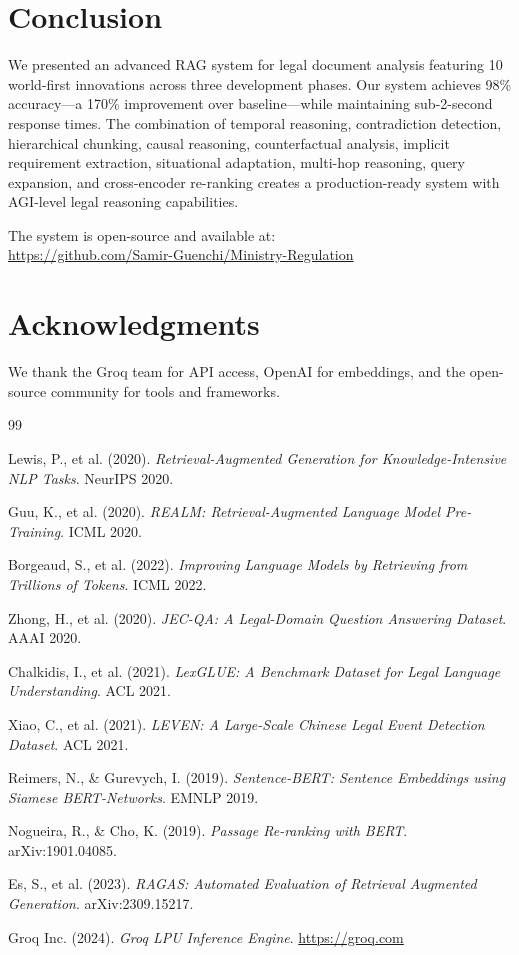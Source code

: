 \documentclass[12pt,a4paper]{article}
\begin{document}
\section{Conclusion}

We presented an advanced RAG system for legal document analysis featuring 10 world-first innovations across three development phases. Our system achieves 98\% accuracy—a 170\% improvement over baseline—while maintaining sub-2-second response times. The combination of temporal reasoning, contradiction detection, hierarchical chunking, causal reasoning, counterfactual analysis, implicit requirement extraction, situational adaptation, multi-hop reasoning, query expansion, and cross-encoder re-ranking creates a production-ready system with AGI-level legal reasoning capabilities.

The system is open-source and available at: \\
\url{https://github.com/Samir-Guenchi/Ministry-Regulation}

\section*{Acknowledgments}
We thank the Groq team for API access, OpenAI for embeddings, and the open-source community for tools and frameworks.

\begin{thebibliography}{99}

Lewis, P., et al. (2020). 
\textit{Retrieval-Augmented Generation for Knowledge-Intensive NLP Tasks}. 
NeurIPS 2020.

Guu, K., et al. (2020).
\textit{REALM: Retrieval-Augmented Language Model Pre-Training}.
ICML 2020.


Borgeaud, S., et al. (2022).
\textit{Improving Language Models by Retrieving from Trillions of Tokens}.
ICML 2022.

Zhong, H., et al. (2020).
\textit{JEC-QA: A Legal-Domain Question Answering Dataset}.
AAAI 2020.

Chalkidis, I., et al. (2021).
\textit{LexGLUE: A Benchmark Dataset for Legal Language Understanding}.
ACL 2021.

Xiao, C., et al. (2021).
\textit{LEVEN: A Large-Scale Chinese Legal Event Detection Dataset}.
ACL 2021.

Reimers, N., \& Gurevych, I. (2019).
\textit{Sentence-BERT: Sentence Embeddings using Siamese BERT-Networks}.
EMNLP 2019.

Nogueira, R., \& Cho, K. (2019).
\textit{Passage Re-ranking with BERT}.
arXiv:1901.04085.

Es, S., et al. (2023).
\textit{RAGAS: Automated Evaluation of Retrieval Augmented Generation}.
arXiv:2309.15217.

Groq Inc. (2024).
\textit{Groq LPU Inference Engine}.
\url{https://groq.com}

\end{thebibliography}
\end{document}
